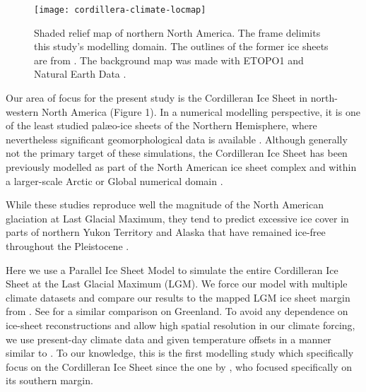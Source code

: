 \begin{figure}[t]
	\vspace*{2mm}
	\begin{center}
		\texttt{[image: cordillera-climate-locmap]}
	\end{center}
	\caption{Shaded relief map of northern North America. The frame delimits this study's modelling domain. The outlines of the former ice sheets are from \citet{kleman-etal-2010}. The background map was made with ETOPO1 \citep{data:etopo1} and Natural Earth Data \citep{data:naturalearth}.}
	\label{fig:locmap}
\end{figure}

Our area of focus for the present study is the Cordilleran Ice Sheet in north-western North America (Figure 1). In a numerical modelling perspective, it is one of the least studied palæo-ice sheets of the Northern Hemisphere, where nevertheless significant geomorphological data is available \citep{jackson-clague-1991}. Although generally not the primary target of these simulations, the Cordilleran Ice Sheet has been previously modelled as part of the North American ice sheet complex \citep{marshall-clarke-1999,calov-etal-2002,tarasov-peltier-2004,bintanja-etal-2005,gregoire-etal-2012} and within a larger-scale Arctic or Global numerical domain \citep{huybrechts-tsiobbel-1996,charbit-etal-2002,johnson-fastook-2002,zweck-huybrechts-2005,abeouchi-etal-2007,charbit-etal-2013}.

While these studies reproduce well the magnitude of the North American glaciation at Last Glacial Maximum, they tend to predict excessive ice cover in parts of northern Yukon Territory and Alaska that have remained ice-free throughout the Pleistocene \citep{dukrodkin-1999,kaufman-manley-2004}.

Here we use a Parallel Ice Sheet Model \citep[PISM,][]{web:pism} to simulate the entire Cordilleran Ice Sheet at the Last Glacial Maximum (LGM). We force our model with multiple climate datasets and compare our results to the mapped LGM ice sheet margin from \citet{kleman-etal-2010}. See \citet{quiquet-etal-2012} for a similar comparison on Greenland. To avoid any dependence on ice-sheet reconstructions and allow high spatial resolution in our climate forcing, we use present-day climate data and given temperature offsets in a manner similar to \citet{bintanja-etal-2005}. To our knowledge, this is the first modelling study which specifically focus on the Cordilleran Ice Sheet since the one by \citep{robert-1991}, who focused specifically on its southern margin.

